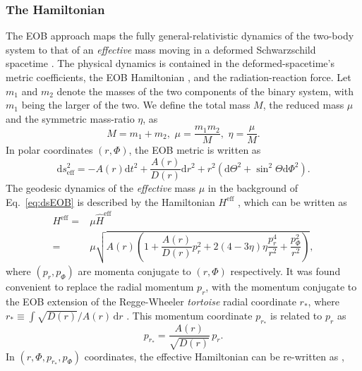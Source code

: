 \documentclass[aps,
prd,
amsmath,
amssymb,
twocolumn,
floatfix,
groupedaddress]{revtex4-1}
\newcommand{\D}{\mathrm{d}}
\newcommand{\eff}{\mathrm{eff}}
\def\l({\left(}
\def\r){\right)}
\begin{document}
\subsubsection{The Hamiltonian}\label{sec:level3:EOBNRv2:Hamiltonian}
The EOB approach maps the fully general-relativistic dynamics of the two-body system to that of an \textit{effective} mass moving in a deformed Schwarzschild spacetime \citep{EOBOriginalBuonannoDamour}. The physical dynamics is contained in the deformed-spacetime's metric coefficients, the EOB Hamiltonian \cite{EOBOriginalBuonannoDamour}, and the radiation-reaction force. Let $m_1$ and $m_2$ denote the masses of the two components of the binary system, with $m_1$ being the larger of the two. We define the total mass $M$, the reduced mass $\mu$ and the symmetric mass-ratio $\eta$, as
\begin{equation}
M = m_1 + m_2, \,\,\mu =\dfrac{m_1m_2}{M},\,\, \eta = \dfrac{\mu}{M}.
\end{equation}
In polar coordinates $(r,\Phi)$, the EOB metric is written as
\begin{equation}\label{eq:dsEOB}
\D s_{\eff}^2 = -A(r)\D t^2 + \dfrac{A(r)}{D(r)}\D r^2 + r^2\left(\D\Theta^2 + \sin^2\Theta \D\Phi^2\right).
\end{equation}
The geodesic dynamics of the \textit{effective} mass $\mu$ in the background of Eq.~\eqref{eq:dsEOB} is described by the Hamiltonian $H^{\eff}$ \citep{EOBEffHamiltonian}, which can be written as \citep{EOBOriginalBuonannoDamour}
\begin{equation}
\begin{split}
H^{\eff} =& \mu\hat{H}^{\eff} \\
         =& \mu\sqrt{A(r) \left( 1 +  \dfrac{A(r)}{D(r)}p_r^2 + 2(4 - 3\eta)\eta \dfrac{p_r^4}{r^2} + \dfrac{p^2_{\Phi}}{r^2} \right)},
\end{split}
\end{equation}
where $(p_r,p_{\Phi})$ are momenta conjugate to $(r,\Phi)$ respectively. It was found convenient to replace the radial momentum $p_r$, with the momentum conjugate to the EOB extension of the Regge-Wheeler \textit{tortoise} radial coordinate $r_*$, where $r_*\equiv\int\sqrt{D(r)}/A(r)\,\D r$ \citep{DamourNQC01} . This momentum coordinate $p_{r_*}$ is related to $p_r$ as
\begin{equation}
p_{r_*} = \dfrac{A(r)}{\sqrt{D(r)}}\,p_r.
\end{equation}
In $\l(r,\Phi,p_{r_*},p_{\Phi}\r)$ coordinates, the effective Hamiltonian can be re-written as \citep{BuonannoEOBv2Main},
\end{document}
